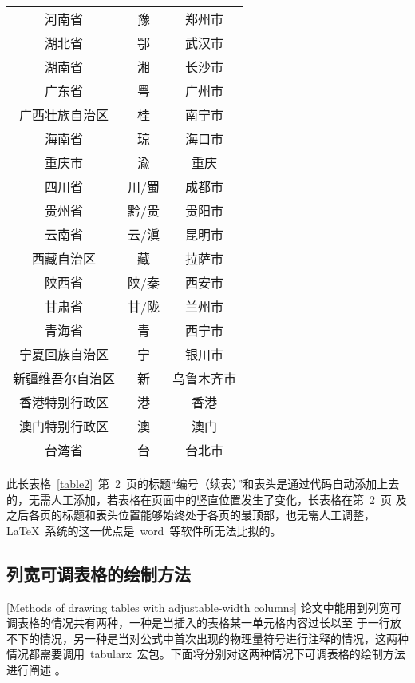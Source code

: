 \begin{longtable}{ccc}
	河南省               & 豫    & 郑州市                  \\
	湖北省               & 鄂    & 武汉市                  \\
	湖南省               & 湘    & 长沙市                  \\
	广东省               & 粤    & 广州市                  \\
	广西壮族自治区       & 桂    & 南宁市                  \\
	海南省               & 琼    & 海口市                  \\
	重庆市               & 渝    & 重庆                    \\
	四川省               & 川/蜀 & 成都市                  \\
	贵州省               & 黔/贵 & 贵阳市                  \\
	云南省               & 云/滇 & 昆明市                  \\
	西藏自治区           & 藏    & 拉萨市                  \\
	陕西省               & 陕/秦 & 西安市                  \\
	甘肃省               & 甘/陇 & 兰州市                  \\
	青海省               & 青    & 西宁市                  \\
	宁夏回族自治区       & 宁    & 银川市                  \\
	新疆维吾尔自治区     & 新    & 乌鲁木齐市              \\
	香港特别行政区       & 港    & 香港                    \\
	澳门特别行政区       & 澳    & 澳门                    \\
	台湾省               & 台    & 台北市                  \\
\end{longtable}\normalsize
\vspace{-1em}

此长表格~\ref{table2}~第~2~页的标题“编号（续表）”和表头是通过代码自动添加上去的，无需人工添加，若表格在页面中的竖直位置发生了变化，长表格在第~2~页
及之后各页的标题和表头位置能够始终处于各页的最顶部，也无需人工调整，\LaTeX~系统的这一优点是~word~等软件所无法比拟的。

\subsection{列宽可调表格的绘制方法}[Methods of drawing tables with adjustable-width columns]
论文中能用到列宽可调表格的情况共有两种，一种是当插入的表格某一单元格内容过长以至
于一行放不下的情况，另一种是当对公式中首次出现的物理量符号进行注释的情况，这两种
情况都需要调用~tabularx~宏包。下面将分别对这两种情况下可调表格的绘制方法进行阐述
。
